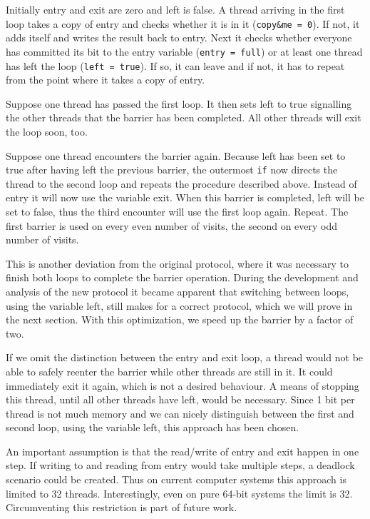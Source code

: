 \documentclass[a4paper, 10pt]{article}
\begin{document}
Initially entry and exit are zero and left is false. A thread arriving in the first loop takes a copy of entry and checks whether it is in it (\texttt{copy\&me = 0}). If not, it adds itself and writes the result back to entry. Next it checks whether everyone has committed its bit to the entry variable (\texttt{entry = full}) or at least one thread has left the loop (\texttt{left = true}). If so, it can leave and if not, it has to repeat from the point where it takes a copy of entry.

Suppose one thread has passed the first loop. It then sets left to true signalling the other threads that the barrier has been completed. All other threads will exit the loop soon, too.

Suppose one thread encounters the barrier again. Because left has been set to true after having left the previous barrier, the outermost \texttt{if} now directs the thread to the second loop and repeats the procedure described above. Instead of entry it will now use the variable exit. When this barrier is completed, left will be set to false, thus the third encounter will use the first loop again. Repeat. The first barrier is used on every even number of visits, the second on every odd number of visits.

This is another deviation from the original protocol, where it was necessary to finish both loops to complete the barrier operation. During the development and analysis of the new protocol it became apparent that switching between loops, using the variable left, still makes for a correct protocol, which we will prove in the next section. With this optimization, we speed up the barrier by a factor of two.

If we omit the distinction between the entry and exit loop, a thread would not be able to safely reenter the barrier while other threads are still in it. It could immediately exit it again, which is not a desired behaviour. A means of stopping this thread, until all other threads have left, would be necessary. Since 1 bit per thread is not much memory and we can nicely distinguish between the first and second loop, using the variable left, this approach has been chosen.

An important assumption is that the read/write of entry and exit happen in one step. If writing to and reading from entry would take multiple steps, a deadlock scenario could be created. Thus on current computer systems this approach is limited to 32 threads. Interestingly, even on pure 64-bit systems the limit is 32. Circumventing this restriction is part of future work.
\end{document}
